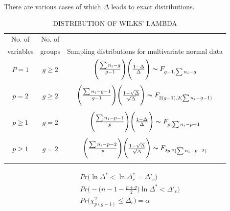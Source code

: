 \documentclass[11pt,a4paper]{article}
\theoremstyle{definition}
\begin{document}
\begin{figure}[H]
\centering
{}
\qquad 
{}
\end{figure}














There are various cases of which $\Delta$ leads to exact distributions.
\begin{table}[H]
\centering
\caption{ DISTRIBUTION OF WILKS' LAMBDA}
\begin{tabular}{ccc}
\hline
No. of & No. of & \\
variables & groups & Sampling distributions for multivariate normal data\\
\hline
$P=1$ & $g\geq 2$ & $\Bigg(\frac{\sum n_i-g}{g-1}\Bigg)\Bigg(\frac{1-\Delta}{\Delta}\Bigg)\thicksim F_{g-1,\sum n_i-g}$\\
&&\\
$p=2$ & $g\geq 2$ & $\Bigg(\frac{\sum n_i-g-1}{g-1}\Bigg)\Bigg(\frac{1-\sqrt{\Delta}}{\sqrt{\Delta}}\Bigg)\thicksim F_{2(g-1),2(\sum n_i-g-1)}$\\
&&\\
$p\geq 1$ & $g=2$ & $\Bigg(\frac{\sum n_i-p-1}{p}\Bigg)\Bigg(\frac{1-\Delta}{\Delta}\Bigg)\thicksim F_{p,\sum n_i-p-1}$\\
&&\\
$p\geq 1$ & $g=2$ & $\Bigg(\frac{\sum n_i - p -2}{p}\Bigg)\Bigg(\frac{1-\sqrt{\Delta}}{\sqrt{\Delta}}\Bigg)\thicksim F_{2p,2(\sum n_i-p-2)}$\\
&&\\
\hline
\end{tabular}
\end{table}


\begin{align*}
& Pr\big(\ln \Delta^* < \ln \Delta^*_c = \Delta'_c\big)\\
& Pr\Big(-\big(n-1-\frac{p+g}{2}\big)\ln \Delta^* < \Delta'_c\Big)\\
& Pr\Big(\chi^2_{p(g-1)}\leq \Delta_c\Big)= \alpha\\
\end{align*}
\end{document}
